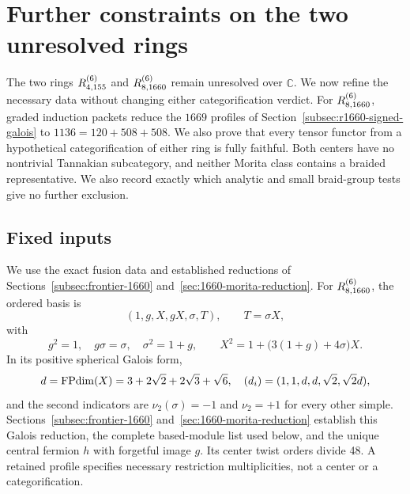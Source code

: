 \section{Further constraints on the two unresolved rings}
\label{sec:refined-frontier}
The two rings $R^{(6)}_{4,155}$ and $R^{(6)}_{8,1660}$ remain unresolved over
$\mathbb C$. We now refine the necessary data without changing either
categorification verdict. For $R^{(6)}_{8,1660}$, graded induction packets
reduce the $1669$ profiles of Section~\ref{subsec:r1660-signed-galois}
to $1136=120+508+508$. We also prove that every tensor functor from a
hypothetical categorification of either ring is fully faithful.
Both centers have no nontrivial
Tannakian subcategory, and neither Morita class contains a braided
representative. We also record exactly which analytic and small
braid-group tests give no further exclusion.

\subsection{Fixed inputs}
We use the exact fusion data and established reductions of Sections~\ref{subsec:frontier-1660} and~\ref{sec:1660-morita-reduction}. For $R^{(6)}_{8,1660}$, the ordered basis is
\[
 (1,g,X,gX,\sigma,T),\qquad T=\sigma X,
\]
with
\[
 g^2=1,\quad g\sigma=\sigma,\quad \sigma^2=1+g,
 \qquad X^2=1+\bigl(3(1+g)+4\sigma\bigr)X.
\]
In its positive spherical Galois form,
\[
 d=\operatorname{FPdim}(X)=3+2\sqrt2+2\sqrt3+\sqrt6,
 \quad (d_i)=(1,1,d,d,\sqrt2,\sqrt2d),
\]
and the second indicators are $\nu_2(\sigma)=-1$ and $\nu_2=+1$ for every other simple. Sections~\ref{subsec:frontier-1660} and~\ref{sec:1660-morita-reduction} establish this Galois reduction, the complete based-module list used below, and the unique central fermion $h$ with forgetful image $g$. Its center twist orders divide 48. A retained profile specifies necessary restriction multiplicities, not a center or a categorification.

